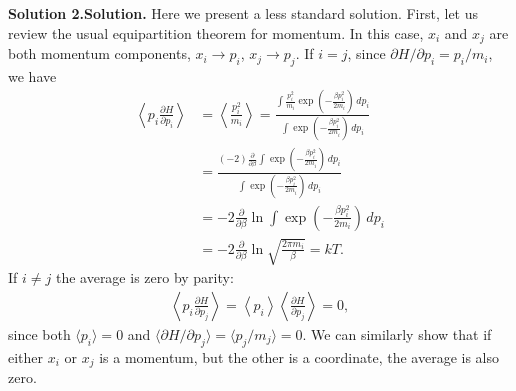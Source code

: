 \documentclass[twocolumn, 10pt]{article}
\numberwithin{equation}{section}
\newenvironment{solution}[1][\empty]
{\par\medskip\sffamily
  \textbf{\ifx\empty#1{Solution.}\relax\else{#1}\fi} \ignorespaces}
{\medskip}
\begin{document}
\begin{solution}[Solution 2.]
Here we present a less standard solution.
First, let us review the usual equipartition theorem for momentum.
%
In this case, $x_i$ and $x_j$ are both momentum components,
$x_i \to p_i$, $x_j \to p_j$.
%
If $i = j$, since $\partial H/\partial p_i = p_i/m_i$,
we have
\begin{align*}
  \left\langle
    p_i \frac{ \partial H } { \partial p_i }
  \right\rangle
  &=
  \left\langle
    \frac{ p_i^2 } { m_i }
  \right\rangle
  =
  \frac{
    \int
    \frac{ p_i^2 } { m_i }
    \exp\left(-\frac{\beta p_i^2}{2m_i}\right) \, d p_i
  }
  {
    \int \exp(-\frac{\beta p_i^2}{2m_i}) \, d p_i
  }
  \\
  &=
  \frac{
    (-2)
    \frac{ \partial } { \partial \beta }
    \int
    \exp\left(-\frac{\beta p_i^2}{2m_i}\right) \, d p_i
  }
  {
    \int \exp(-\frac{\beta p_i^2}{2m_i}) \, d p_i
  }
  \\
  &=
  -2
  \frac{ \partial } { \partial \beta }
  \ln \int
  \exp\left(-\frac{\beta p_i^2}{2m_i}\right) \, d p_i
  \\
  &=
  -2
  \frac{ \partial } { \partial \beta }
  \ln \sqrt{\frac{2\pi m_i} { \beta } }
  =
  kT
  .
\end{align*}
If $i \ne j$ the average is zero by parity:
\begin{align*}
  \left\langle
    p_i \frac{ \partial H } { \partial p_j }
  \right\rangle
  =
  \left\langle
    p_i
  \right\rangle
  \left\langle
    \frac{ \partial H } { \partial p_j }
  \right\rangle
  =
  0
  ,
\end{align*}
since both $\langle p_i \rangle = 0$
and $\langle \partial H/\partial p_j \rangle = \langle p_j/m_j \rangle = 0$.
%
We can similarly show that if either $x_i$ or $x_j$ is a momentum,
but the other is a coordinate, the average is also zero.


\end{solution}
\end{document}
